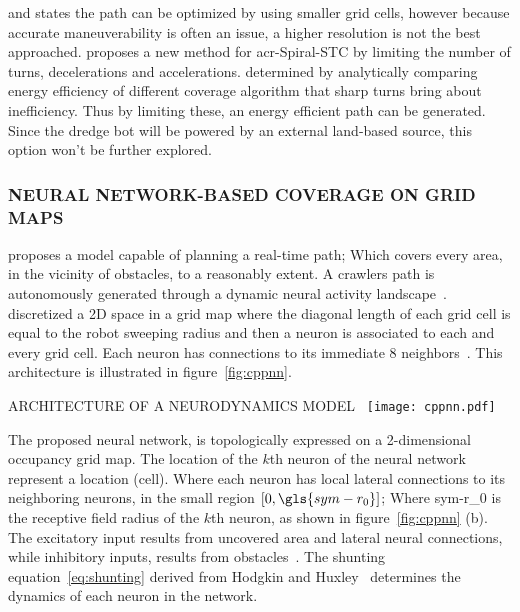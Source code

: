 \citet{wong_qualitative_2006} and \citet{lee_smooth_2011} states the path can be optimized by using smaller grid cells,
however because accurate maneuverability is often an issue, a higher resolution is not the best approached.
\citeauthor{lee_smooth_2011} proposes a new method for \gls{acr-Spiral-STC} by limiting the number of turns,
decelerations and accelerations. \citet{mei_energy-efficient_2004} determined by analytically comparing energy
efficiency of different coverage algorithm that sharp turns bring about inefficiency. Thus by limiting these, an energy
efficient path can be generated. Since the dredge bot will be powered by an external land-based source, this option
won't be further explored.

\subsubsection{NEURAL NETWORK-BASED COVERAGE ON GRID MAPS}
\citet{luo_solution_2002} proposes a model capable of planning a real-time path; Which covers every area, in
the vicinity of obstacles, to a reasonably extent. A crawlers path is autonomously generated through a dynamic neural
activity landscape~\cite{luo_solution_2002}\cite{luo_bioinspired_2008}. \citeauthor{luo_solution_2002} discretized a 2D
space in a grid map where the diagonal length of each grid cell is equal to the robot sweeping radius and then a neuron
is associated to each and every grid cell. Each neuron has connections to its immediate 8
neighbors~\cite{galceran_survey_2013}. This architecture is illustrated in figure~\ref{fig:cppnn}.

\begin{RoyalFigure}[!htb, label=fig:cppnn]{ARCHITECTURE OF A NEURODYNAMICS MODEL~\cite{yan_complete_2012}}
    \texttt{[image: cppnn.pdf]}
\end{RoyalFigure}

The proposed neural network, is topologically expressed on a 2-dimensional occupancy grid map. The location of the
\(k\)th neuron of the neural network represent a location (cell). Where each neuron has local lateral connections
to its neighboring neurons, in the small region \( [0,\gls{sym-r_0}] \); Where \gls{sym-r_0} is the receptive field
radius of the \( k \)th neuron, as shown in figure~\ref{fig:cppnn} (b). The excitatory input results from uncovered area
and lateral neural connections, while inhibitory inputs, results from obstacles~\cite{yan_complete_2012}. The shunting
equation~\ref{eq:shunting} derived from Hodgkin and Huxley~\cite{hodgkin_quantitative_1952} determines the dynamics of
each neuron in the network.

